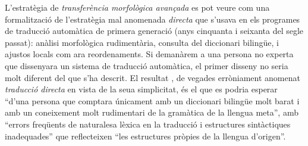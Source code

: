 L'estratègia de \emph{transferència morfològica avançada} es pot veure
com una formalització de l'estratègia mal anomenada \emph{directa} que
s'usava en els programes de traducció automàtica de primera generació
(anys cinquanta i seixanta del segle passat): anàlisi morfològica
rudimentària, consulta del diccionari bilingüe, i ajustos locals com
ara reordenaments. Si demanàrem a una persona no experta que
dissenyara un sistema de traducció automàtica, el primer disseny no
seria molt diferent del que s'ha descrit.  El resultat
\citep[secció~4.2]{hutchins92b}, de vegades erròniament anomenat
\emph{traducció directa} en vista de la seua simplicitat, és el que es
podria esperar ``d'una persona que comptara únicament amb un
diccionari bilingüe molt barat i amb un coneixement molt rudimentari
de la gramàtica de la llengua meta'', amb ``errors freqüents de
naturalesa lèxica en la traducció i estructures sintàctiques
inadequades'' que reflecteixen ``les estructures pròpies de la llengua
d'origen''.

